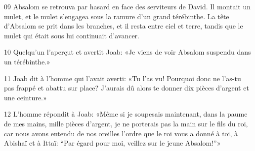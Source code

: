 
09 Absalom se retrouva par hasard en face des serviteurs de David. Il montait un mulet, et le mulet s’engagea sous la ramure d’un grand térébinthe. La tête d’Absalom se prit dans les branches, et il resta entre ciel et terre, tandis que le mulet qui était sous lui continuait d’avancer.

10 Quelqu’un l’aperçut et avertit Joab: «Je viens de voir Absalom suspendu dans un térébinthe.»

11 Joab dit à l’homme qui l’avait averti: «Tu l’as vu! Pourquoi donc ne l’as-tu pas frappé et abattu sur place? J’aurais dû alors te donner dix pièces d’argent et une ceinture.»

12 L’homme répondit à Joab: «Même si je soupesais maintenant, dans la paume de mes mains, mille pièces d’argent, je ne porterais pas la main sur le fils du roi, car nous avons entendu de nos oreilles l’ordre que le roi vous a donné à toi, à Abishaï et à Ittaï: “Par égard pour moi, veillez sur le jeune Absalom!”»
